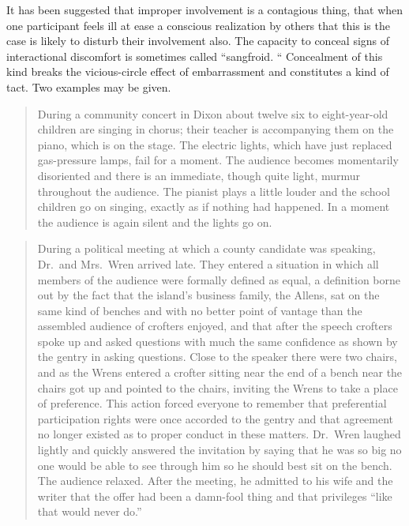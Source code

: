 \documentclass[twoside,symmetric,nobib,justified]{tufte-book}
\begin{document}
It has been suggested that improper involvement is a contagious thing,
that when one participant feels ill at ease a conscious realization by
others that this is the case is likely to disturb their involvement
also. The capacity to conceal signs of interactional discomfort is
sometimes called ``sangfroid. `` Concealment of this kind breaks the
vicious-circle effect of embarrassment and constitutes a kind of tact.
Two examples may be given.

\begin{quote}
During a community concert in Dixon about twelve six to eight-year-old
children are singing in chorus; their teacher is accompanying them on
the piano, which is on the stage. The electric lights, which have just
replaced gas-pressure lamps, fail for a moment. The audience becomes
momentarily disoriented and there is an immediate, though quite light,
murmur throughout the audience. The pianist plays a little louder and
the school children go on singing, exactly as if nothing had happened.
In a moment the audience is again silent and the lights go on.
\end{quote}

\begin{quote}
During a political meeting at which a county candidate was speaking,
Dr.~and Mrs.~Wren arrived late. They entered a situation in which all
members of the audience were formally defined as equal, a definition
borne out by the fact that the island's business family, the Allens, sat
on the same kind of benches and with no better point of vantage than the
assembled audience of crofters enjoyed, and that after the speech
crofters spoke up and asked questions with much the same confidence as
shown by the gentry in asking questions. Close to the speaker there were
two chairs, and as the Wrens entered a crofter sitting near the end of a
bench near the chairs got up and pointed to the chairs, inviting the
Wrens to take a place of preference. This action forced everyone to
remember that preferential participation rights were once accorded to
the gentry and that agreement no longer existed as to proper conduct in
these matters. Dr.~Wren laughed lightly and quickly answered the
invitation by saying that he was so big no one would be able to see
through him so he should best sit on the bench. The audience relaxed.
After the meeting, he admitted to his wife and the writer that the offer
had been a damn-fool thing and that privileges ``like that would never
do.''
\end{quote}
\end{document}
